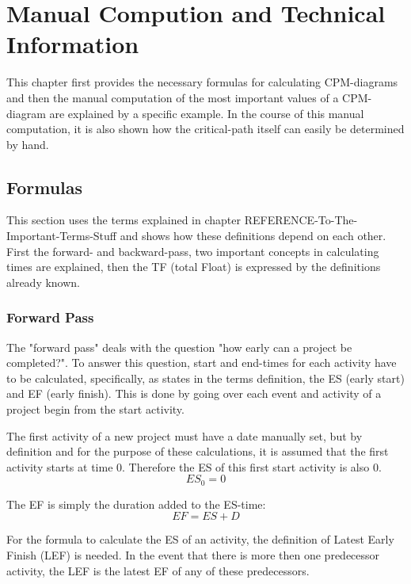 \section{Manual Compution and Technical Information}

This chapter first provides the necessary formulas for calculating CPM-diagrams and then the manual computation of the most important values of a CPM-diagram are explained by a specific example. In the course of this manual computation, it is also shown how the critical-path itself can easily be determined by hand.

\subsection{Formulas} \label{formulas}

This section uses the terms explained in chapter REFERENCE-To-The-Important-Terms-Stuff and shows how these definitions depend on each other.
First the forward- and backward-pass, two important concepts in calculating times are explained, then the TF (total Float) is expressed by the definitions already known.
\subsubsection{Forward Pass} \label{forwardPass}
The "forward pass" deals with the question "how early can a project be completed?". To answer this question, start and end-times for each activity have to be calculated, specifically, as states in the terms definition, the ES (early start) and EF (early finish).
This is done by going over each event and activity of a project begin from the start activity.

The first activity of a new project must have a date manually set, but by definition and for the purpose of these calculations, it is assumed that the first activity starts at time 0.\cite{obrien} Therefore the ES of this first start activity is also 0.
\begin{equation}
ES_{0} = 0
\end{equation}

The EF is simply the duration added to the ES-time:
\begin{equation}
EF = ES + D
\end{equation}

For the formula to calculate the ES of an activity, the definition of Latest Early Finish (LEF) is needed. In the event that there is more then one predecessor activity, the LEF is the latest EF of any of these predecessors.

